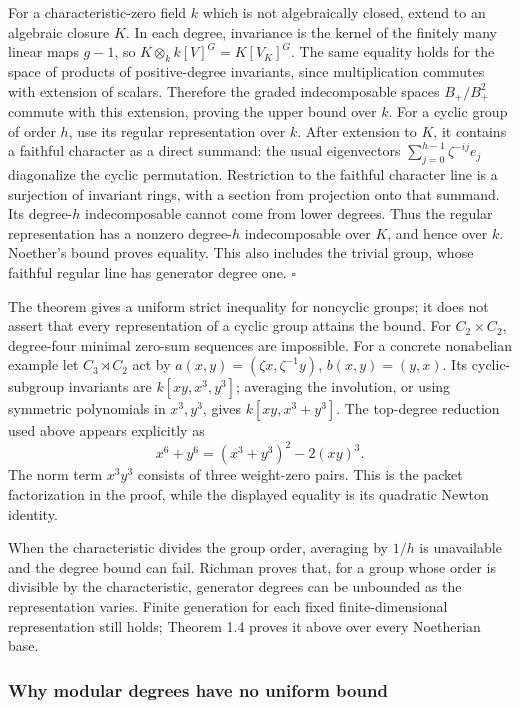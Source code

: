 \documentclass[
]{article}
\begin{document}
For a characteristic-zero field \(k\) which is not algebraically closed,
extend to an algebraic closure \(K\). In each degree, invariance is the
kernel of the finitely many linear maps \(g-1\), so
\(K\otimes_k k [V]^G=K [V_K]^G\). The same equality holds for the space
of products of positive-degree invariants, since multiplication commutes
with extension of scalars. Therefore the graded indecomposable spaces
\(B_+/B_+^2\) commute with this extension, proving the upper bound over
\(k\). For a cyclic group of order \(h\), use its regular representation
over \(k\). After extension to \(K\), it contains a faithful character
as a direct summand: the usual eigenvectors
\(\sum_{j=0}^{h-1}\zeta^{-ij}e_j\) diagonalize the cyclic permutation.
Restriction to the faithful character line is a surjection of invariant
rings, with a section from projection onto that summand. Its
degree-\(h\) indecomposable cannot come from lower degrees. Thus the
regular representation has a nonzero degree-\(h\) indecomposable over
\(K\), and hence over \(k\). Noether's bound proves equality. This also
includes the trivial group, whose faithful regular line has generator
degree one. \(\square\)

The theorem gives a uniform strict inequality for noncyclic groups; it
does not assert that every representation of a cyclic group attains the
bound. For \(C_2\times C_2\), degree-four minimal zero-sum sequences are
impossible. For a concrete nonabelian example let \(C_3\rtimes C_2\) act
by \(a(x,y)=(\zeta x,\zeta^{-1}y)\), \(b(x,y)=(y,x)\). Its
cyclic-subgroup invariants are \(k [xy,x^3,y^3]\); averaging the
involution, or using symmetric polynomials in \(x^3,y^3\), gives
\(k [xy,x^3+y^3]\). The top-degree reduction used above appears
explicitly as \[
x^6+y^6=(x^3+y^3)^2-2(xy)^3.
\] The norm term \(x^3y^3\) consists of three weight-zero pairs. This is
the packet factorization in the proof, while the displayed equality is
its quadratic Newton identity.

When the characteristic divides the group order, averaging by \(1/h\) is
unavailable and the degree bound can fail. Richman proves that, for a
group whose order is divisible by the characteristic, generator degrees
can be unbounded as the representation varies. Finite generation for
each fixed finite-dimensional representation still holds; Theorem 1.4
proves it above over every Noetherian base.

\subsubsection{Why modular degrees have no uniform
bound}\label{why-modular-degrees-have-no-uniform-bound}
\end{document}
